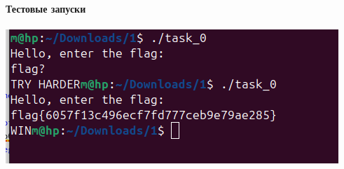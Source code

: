 \newpage

\paragraph{Тестовые запуски}

\paragraph{}
\includegraphics[width=0.7\linewidth]{static/solution_task_0}

